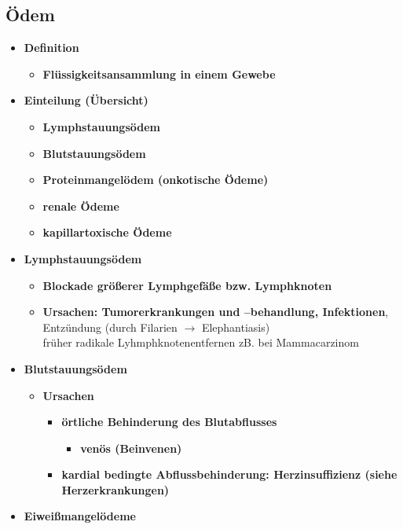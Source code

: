 \subsection{Ödem}
	\begin{itemize}
		\item \textbf{Definition}
			\begin{itemize}
				\item \textbf{Flüssigkeitsansammlung in einem Gewebe}
			\end{itemize}
		\item \textbf{Einteilung (Übersicht)}
			\begin{itemize}
				\item \textbf{Lymphstauungsödem}
				\item \textbf{Blutstauungsödem}
				\item \textbf{Proteinmangelödem (onkotische Ödeme)}
				\item \textbf{renale Ödeme}
				\item \textbf{kapillartoxische Ödeme}
			\end{itemize}
		\item \textbf{Lymphstauungsödem}
			\begin{itemize}
				\item \textbf{Blockade größerer Lymphgefäße bzw. Lymphknoten}
				\item \textbf{Ursachen: Tumorerkrankungen und –behandlung, Infektionen}, Entzündung (durch Filarien $\rightarrow$ Elephantiasis)\\
					früher radikale Lyhmphknotenentfernen zB. bei Mammacarzinom
			\end{itemize}
		\item \textbf{Blutstauungsödem}
			\begin{itemize}
				\item \textbf{Ursachen}
					\begin{itemize}
						\item \textbf{örtliche Behinderung des Blutabflusses}
							\begin{itemize}
								\item \textbf{venös (Beinvenen)}
							\end{itemize}
						\item \textbf{kardial bedingte Abflussbehinderung: Herzinsuffizienz (siehe Herzerkrankungen)}
					\end{itemize}
			\end{itemize}
		\item \textbf{Eiweißmangelödeme}
			\begin{itemize}

\end{itemize}
\end{itemize}
